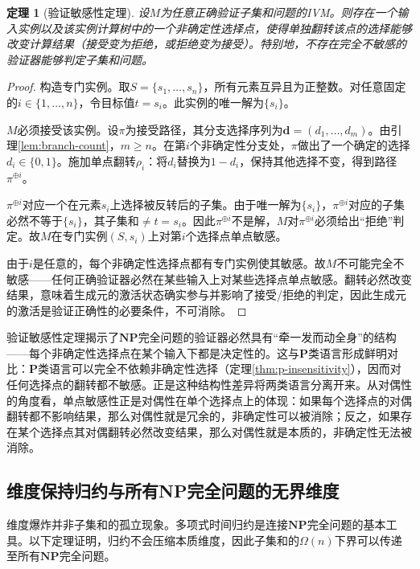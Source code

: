 \documentclass{ctexart}
\newtheorem{theorem}{定理}[section]
\newtheorem{proof}[theorem]{证明}
\begin{document}
	\begin{theorem}[验证敏感性定理]\label{thm:sensitivity}
		设$M$为任意正确验证子集和问题的IVM。则存在一个输入实例以及该实例计算树中的一个非确定性选择点，使得单独翻转该点的选择能够改变计算结果（接受变为拒绝，或拒绝变为接受）。特别地，不存在完全不敏感的验证器能够判定子集和问题。
	\end{theorem}
	\begin{proof}
		构造专门实例。取$S = \{s_1,\dots,s_n\}$，所有元素互异且为正整数。对任意固定的$i \in \{1, \dots, n\}$，令目标值$t = s_i$。此实例的唯一解为$\{s_i\}$。
		
		$M$必须接受该实例。设$\pi$为接受路径，其分支选择序列为$\mathbf{d} = (d_1, \dots, d_m)$。由引理\ref{lem:branch-count}，$m \ge n$。在第$i$个非确定性分支处，$\pi$做出了一个确定的选择$d_i \in \{0, 1\}$。施加单点翻转$\rho_i$：将$d_i$替换为$1 - d_i$，保持其他选择不变，得到路径$\pi^{\oplus i}$。
		
		$\pi^{\oplus i}$对应一个在元素$s_i$上选择被反转后的子集。由于唯一解为$\{s_i\}$，$\pi^{\oplus i}$对应的子集必然不等于$\{s_i\}$，其子集和$\neq t = s_i$。因此$\pi^{\oplus i}$不是解，$M$对$\pi^{\oplus i}$必须给出``拒绝''判定。故$M$在专门实例$(S, s_i)$上对第$i$个选择点单点敏感。
		
		由于$i$是任意的，每个非确定性选择点都有专门实例使其敏感。故$M$不可能完全不敏感——任何正确验证器必然在某些输入上对某些选择点单点敏感。翻转必然改变结果，意味着生成元的激活状态确实参与并影响了接受/拒绝的判定，因此生成元的激活是验证正确性的必要条件，不可消除。
	\end{proof}
	
	验证敏感性定理揭示了$\mathbf{NP}$完全问题的验证器必然具有``牵一发而动全身''的结构——每个非确定性选择点在某个输入下都是决定性的。这与$\mathbf{P}$类语言形成鲜明对比：$\mathbf{P}$类语言可以完全不依赖非确定性选择（定理\ref{thm:p-insensitivity}），因而对任何选择点的翻转都不敏感。正是这种结构性差异将两类语言分离开来。从对偶性的角度看，单点敏感性正是对偶性在单个选择点上的体现：如果每个选择点的对偶翻转都不影响结果，那么对偶性就是冗余的，非确定性可以被消除；反之，如果存在某个选择点其对偶翻转必然改变结果，那么对偶性就是本质的，非确定性无法被消除。
	
	\subsection{维度保持归约与所有NP完全问题的无界维度}
	
	维度爆炸并非子集和的孤立现象。多项式时间归约是连接$\mathbf{NP}$完全问题的基本工具。以下定理证明，归约不会压缩本质维度，因此子集和的$\Omega(n)$下界可以传递至所有$\mathbf{NP}$完全问题。
	
\end{document}
